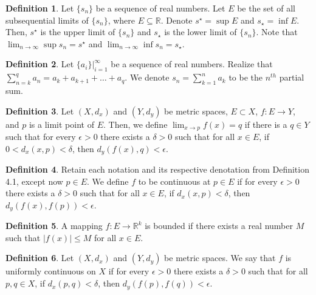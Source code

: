 \documentclass[12pt]{article}
\theoremstyle{definition}
\newtheorem{definition}{Definition}
\theoremstyle{named}
\begin{document}
\renewcommand{\thedefinition}{3.16}
\begin{definition}
    Let $\{s_n\}$ be a sequence of real numbers. Let $E$ be the set of all subsequential limits of $\{s_n\}$, where $E \subseteq \mathbb{R}$. Denote $s^\star = \sup E$ and $s_\star = \inf E$. Then, $s^\star$ is the upper limit of $\{s_n\}$ and $s_\star$ is the lower limit of $\{s_n\}$. Note that $\lim_{n \to \infty} \sup s_n = s^\star$ and $\lim_{n \to \infty} \inf s_n = s_\star$. 
\end{definition}

\renewcommand{\thedefinition}{3.21}
\begin{definition}
    Let $\{a_i\} \biggr\rvert_{i=1}^{\infty}$ be a sequence of real numbers. Realize that $\sum_{n=k}^{q} a_n = a_k + a_{k+1} + \dots + a_q$. We denote $s_n = \sum_{k=1}^{n} a_k$ to be the $n^{th}$ partial sum. 
\end{definition}

\renewcommand{\thedefinition}{4.1}
\begin{definition}
    Let $(X, d_x)$ and $(Y, d_y)$ be metric spaces, $E \subset X$, $f: E \to Y$, and $p$ is a limit point of $E$. Then, we define $\lim_{x \to p} f(x) = q$ if there is a $q \in Y$ such that for every $\epsilon > 0$ there exists a $\delta > 0$ such that for all $x \in E$, if $0 < d_x(x,p) < \delta$, then $d_y(f(x), q) < \epsilon$. 
\end{definition}

\renewcommand{\thedefinition}{4.5}
\begin{definition}
    Retain each notation and its respective denotation from Definition 4.1, except now $p \in E$. We define $f$ to be continuous at $p \in E$ if for every $\epsilon > 0$ there exists a $\delta > 0$ such that for all $x \in E$, if $d_x(x,p) < \delta$, then $d_y(f(x), f(p)) < \epsilon$. 
\end{definition}

\renewcommand{\thedefinition}{4.13}
\begin{definition}
    A mapping $f: E \to \mathbb{R}^k$ is bounded if there exists a real number $M$ such that $\left|f(x)\right| \leq M$ for all $x \in E$. 
\end{definition}

\renewcommand{\thedefinition}{4.18}
\begin{definition}
    Let $(X, d_x)$ and $(Y, d_y)$ be metric spaces. We say that $f$ is uniformly continuous on $X$ if for every $\epsilon > 0$ there exists a $\delta > 0$ such that for all $p,q \in X$, if $d_x(p,q) < \delta$, then $d_y(f(p), f(q)) < \epsilon$. 
\end{definition}
\end{document}
